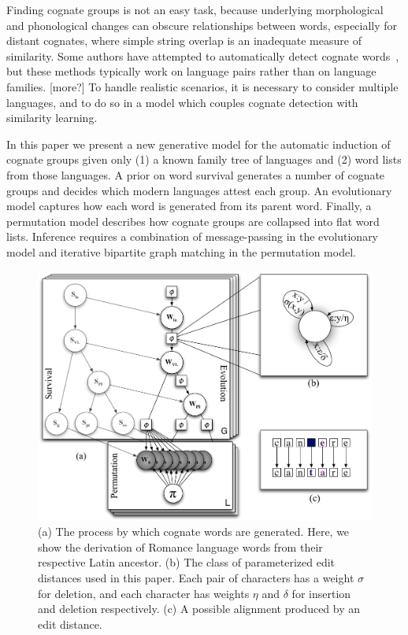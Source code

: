 \documentclass[11pt,a4paper]{article}
\begin{document}
Finding cognate groups is not an easy task, because underlying
morphological and phonological changes can obscure relationships
between words, especially for distant cognates, where simple string
overlap is an inadequate measure of similarity.  Some authors have
attempted to automatically detect cognate
words~\cite{lowe94reconstruction,oakes00computer,Kondrak01identifyingcognates,mulloni07automatic},
but these methods typically work on language pairs rather than on
language families.  [more?]  To handle realistic scenarios, it is
necessary to consider multiple languages, and to do so in a model
which couples cognate detection with similarity learning.

In this paper we present a new generative model for the automatic
induction of cognate groups given only (1) a known family tree of
languages and (2) word lists from those languages.  A prior on word
survival generates a number of cognate groups and decides which
modern languages attest each group.  An evolutionary model captures
how each word is generated from its parent word.  Finally, a
permutation model describes how cognate groups are collapsed into
flat word lists.  Inference requires a combination of message-passing
in the evolutionary model and iterative bipartite graph matching
in the permutation model.

\begin{figure}
  \centering
  \includegraphics[scale=0.35]{gmodel}
  \caption{(a) The process by which cognate words are generated.
  Here, we show the derivation of Romance language words from their
  respective Latin ancestor. (b) The class of parameterized edit
  distances used in this paper. Each pair of characters has a weight
  $\sigma$ for deletion, and each character has weights $\eta$ and
  $\delta$ for insertion and deletion respectively. (c) A possible
  alignment produced by an edit distance.}
  \label{fig:gmodel}
\end{figure}
\end{document}
